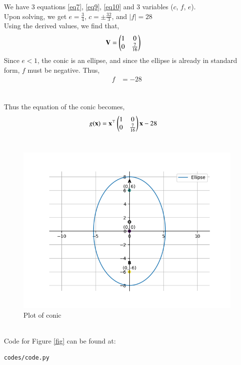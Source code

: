 \documentclass[journal]{IEEEtran}
\begin{document}
We have 3 equations \ref{eq7}, \ref{eq9}, \ref{eq10} and 3 variables ($c$, $f$, $e$).
\\ 
Upon solving, we get $e=\frac{3}{4}$, $c=\pm\frac{32}{3}$, and $|f|=28$
\\
Using the derived values, we find that,
\begin{align}
	\mathbf{V} &= \begin{pmatrix}1&0\\0&\frac{7}{16}\end{pmatrix}
\end{align}
Since $e < 1$, the conic is an ellipse, and since the ellipse is already in standard form, $f$ must be negative. Thus,
\begin{align}
	f&=-28
\end{align}
\\ \\
Thus the equation of the conic becomes,  
\begin{align}
g(\mathbf{x}) &= \mathbf{x}^\top\begin{pmatrix}1&0\\0&\frac{7}{16}\end{pmatrix}\mathbf{x}-28 \label{eq11}
\end{align}
\\
\begin{figure}[h]
	\centering
	\includegraphics[width=\columnwidth]{figs/fig.png}
	\caption{Plot of conic}
	\label{fig}
\end{figure}
\\
Code for Figure \eqref{fig} can be found at:
\begin{lstlisting}
codes/code.py
\end{lstlisting}
\end{document}

